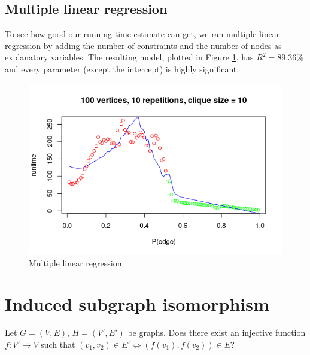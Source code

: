 \documentclass{article}
\begin{document}
\subsection{Multiple linear regression}
To see how good our running time estimate can get, we ran multiple linear regression by adding the number of constraints and the number of nodes as explanatory variables. The resulting model, plotted in Figure \ref{fig:regression2}, has $R^2 = 89.36\%$ and every parameter (except the intercept) is highly significant.
\begin{figure}
  \includegraphics[scale=0.5]{regression2.png}
  \caption{Multiple linear regression}
  \label{fig:regression2}
\end{figure}
\section{Induced subgraph isomorphism}
Let $G = (V, E)$, $H = (V', E')$ be graphs. Does there exist an injective function $f: V' \to V$ such that $(v_1, v_2) \in E' \iff (f(v_1), f(v_2)) \in E$?
\end{document}

